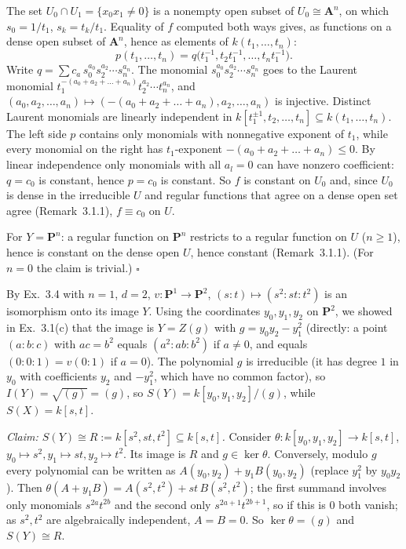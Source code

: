 \documentclass[11pt]{article}
\begin{document}
The set $U_0\cap U_1=\{x_0x_1\ne0\}$ is a nonempty open subset of $U_0\cong\mathbf A^n$, on which $s_0=1/t_1$, $s_k=t_k/t_1$. Equality of $f$ computed both ways gives, as functions on a dense open subset of $\mathbf A^n$, hence as elements of $k(t_1,\dots,t_n)$:
\[
p(t_1,\dots,t_n)=q\bigl(t_1^{-1},t_2t_1^{-1},\dots,t_nt_1^{-1}\bigr).
\]
Write $q=\sum c_{a}\,s_0^{a_0}s_2^{a_2}\cdots s_n^{a_n}$. The monomial $s_0^{a_0}s_2^{a_2}\cdots s_n^{a_n}$ goes to the Laurent monomial $t_1^{-(a_0+a_2+\dots+a_n)}t_2^{a_2}\cdots t_n^{a_n}$, and $(a_0,a_2,\dots,a_n)\mapsto(-(a_0+a_2+\dots+a_n),a_2,\dots,a_n)$ is injective. Distinct Laurent monomials are linearly independent in $k[t_1^{\pm1},t_2,\dots,t_n]\subseteq k(t_1,\dots,t_n)$. The left side $p$ contains only monomials with nonnegative exponent of $t_1$, while every monomial on the right has $t_1$-exponent $-(a_0+a_2+\dots+a_n)\le0$. By linear independence only monomials with all $a_l=0$ can have nonzero coefficient: $q=c_0$ is constant, hence $p=c_0$ is constant. So $f$ is constant on $U_0$ and, since $U_0$ is dense in the irreducible $U$ and regular functions that agree on a dense open set agree (Remark~3.1.1), $f\equiv c_0$ on $U$.

For $Y=\mathbf P^n$: a regular function on $\mathbf P^n$ restricts to a regular function on $U$ ($n\ge1$), hence is constant on the dense open $U$, hence constant (Remark~3.1.1). (For $n=0$ the claim is trivial.) \hfill$\square$


\pf
By Ex.~3.4 with $n=1$, $d=2$, $v:\mathbf P^1\to\mathbf P^2$, $(s:t)\mapsto(s^2:st:t^2)$ is an isomorphism onto its image $Y$. Using the coordinates $y_0,y_1,y_2$ on $\mathbf P^2$, we showed in Ex.~3.1(c) that the image is $Y=Z(g)$ with $g=y_0y_2-y_1^2$ (directly: a point $(a:b:c)$ with $ac=b^2$ equals $(a^2:ab:b^2)$ if $a\ne0$, and equals $(0:0:1)=v(0:1)$ if $a=0$). The polynomial $g$ is irreducible (it has degree $1$ in $y_0$ with coefficients $y_2$ and $-y_1^2$, which have no common factor), so $I(Y)=\sqrt{(g)}=(g)$, so $S(Y)=k[y_0,y_1,y_2]/(g)$, while $S(X)=k[s,t]$.

\emph{Claim: $S(Y)\cong R:=k[s^2,st,t^2]\subseteq k[s,t]$.} Consider $\theta:k[y_0,y_1,y_2]\to k[s,t]$, $y_0\mapsto s^2,y_1\mapsto st,y_2\mapsto t^2$. Its image is $R$ and $g\in\ker\theta$. Conversely, modulo $g$ every polynomial can be written as $A(y_0,y_2)+y_1B(y_0,y_2)$ (replace $y_1^2$ by $y_0y_2$). Then $\theta(A+y_1B)=A(s^2,t^2)+st\,B(s^2,t^2)$; the first summand involves only monomials $s^{2a}t^{2b}$ and the second only $s^{2a+1}t^{2b+1}$, so if this is $0$ both vanish; as $s^2,t^2$ are algebraically independent, $A=B=0$. So $\ker\theta=(g)$ and $S(Y)\cong R$.
\end{document}
